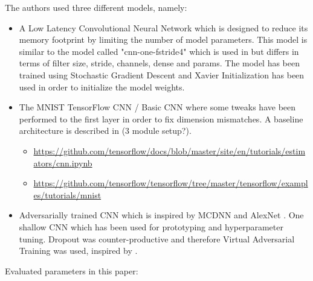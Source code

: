 \documentclass{article}
\theoremstyle{definition}
\theoremstyle{remark}
\begin{document}
The authors used three different models, namely:

\begin{itemize}
	\item A Low Latency Convolutional Neural Network which is designed to reduce its memory footprint by limiting the number of model parameters. This model is similar to the model called "cnn-one-fstride4" which is used in \cite{sainath2015convolutional} but differs in terms of filter size, stride, channels, dense and params. The model has been trained using Stochastic Gradient Descent and Xavier Initialization has been used in order to initialize the model weights.
	\item The MNIST TensorFlow CNN / Basic CNN where some tweaks have been performed to the first layer in order to fix dimension mismatches. A baseline architecture is described in \cite{sainath2015convolutional} (3 module setup?).
	
		\begin{itemize}
			\item \url{https://github.com/tensorflow/docs/blob/master/site/en/tutorials/estimators/cnn.ipynb}
			\item \url{https://github.com/tensorflow/tensorflow/tree/master/tensorflow/examples/tutorials/mnist}
		\end{itemize}
		
		\item Adversarially trained CNN which is inspired by MCDNN \cite{cirecsan2012multi} and AlexNet \cite{krizhevsky2012imagenet}. One shallow CNN which has been used for prototyping and hyperparameter tuning. Dropout was counter-productive and therefore Virtual Adversarial Training was used, inspired by \cite{goodfellow2016deep}.
		
\end{itemize}

Evaluated parameters in this paper:
\end{document}
